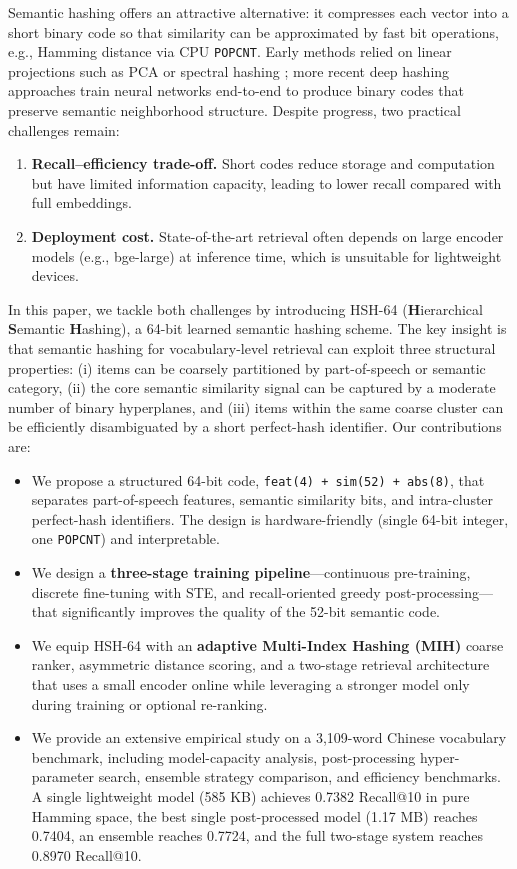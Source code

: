\documentclass[11pt,a4paper]{article}
\begin{document}
Semantic hashing \citep{salakhutdinov2009semantic} offers an attractive alternative: it compresses each vector into a short binary code so that similarity can be approximated by fast bit operations, e.g., Hamming distance via CPU \texttt{POPCNT}. Early methods relied on linear projections such as PCA or spectral hashing \citep{weiss2009spectral}; more recent deep hashing approaches \citep{xia2014supervised,cao2015deep,li2016feature} train neural networks end-to-end to produce binary codes that preserve semantic neighborhood structure. Despite progress, two practical challenges remain:
\begin{enumerate}[leftmargin=*]
    \item \textbf{Recall--efficiency trade-off.} Short codes reduce storage and computation but have limited information capacity, leading to lower recall compared with full embeddings.
    \item \textbf{Deployment cost.} State-of-the-art retrieval often depends on large encoder models (e.g., bge-large) at inference time, which is unsuitable for lightweight devices.
\end{enumerate}

In this paper, we tackle both challenges by introducing HSH-64 (\textbf{H}ierarchical \textbf{S}emantic \textbf{H}ashing), a 64-bit learned semantic hashing scheme. The key insight is that semantic hashing for vocabulary-level retrieval can exploit three structural properties: (i) items can be coarsely partitioned by part-of-speech or semantic category, (ii) the core semantic similarity signal can be captured by a moderate number of binary hyperplanes, and (iii) items within the same coarse cluster can be efficiently disambiguated by a short perfect-hash identifier. Our contributions are:
\begin{itemize}[leftmargin=*]
    \item We propose a structured 64-bit code, \texttt{feat(4) + sim(52) + abs(8)}, that separates part-of-speech features, semantic similarity bits, and intra-cluster perfect-hash identifiers. The design is hardware-friendly (single 64-bit integer, one \texttt{POPCNT}) and interpretable.
    \item We design a \textbf{three-stage training pipeline}---continuous pre-training, discrete fine-tuning with STE, and recall-oriented greedy post-processing---that significantly improves the quality of the 52-bit semantic code.
    \item We equip HSH-64 with an \textbf{adaptive Multi-Index Hashing (MIH)} coarse ranker, asymmetric distance scoring, and a two-stage retrieval architecture that uses a small encoder online while leveraging a stronger model only during training or optional re-ranking.
    \item We provide an extensive empirical study on a 3,109-word Chinese vocabulary benchmark, including model-capacity analysis, post-processing hyper-parameter search, ensemble strategy comparison, and efficiency benchmarks. A single lightweight model (585 KB) achieves 0.7382 Recall@10 in pure Hamming space, the best single post-processed model (1.17 MB) reaches 0.7404, an ensemble reaches 0.7724, and the full two-stage system reaches 0.8970 Recall@10.
\end{itemize}
\end{document}

